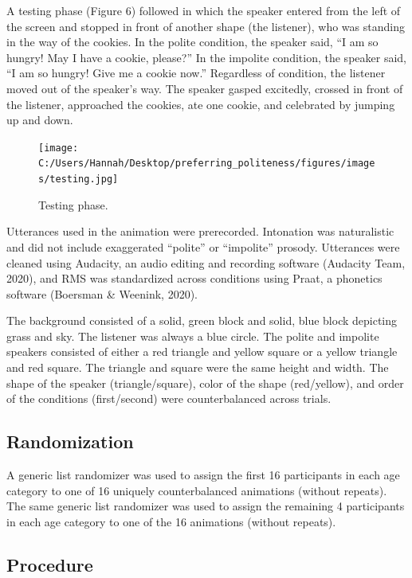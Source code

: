 \documentclass[
  english,
  man,floatsintext]{apa6}
\begin{document}
A testing phase (Figure 6) followed in which the speaker entered from the left of the screen and stopped in front of another shape (the listener), who was standing in the way of the cookies. In the polite condition, the speaker said, ``I am so hungry! May I have a cookie, please?'' In the impolite condition, the speaker said, ``I am so hungry! Give me a cookie now.'' Regardless of condition, the listener moved out of the speaker's way. The speaker gasped excitedly, crossed in front of the listener, approached the cookies, ate one cookie, and celebrated by jumping up and down.

\begin{figure}
\centering
\texttt{[image: C:/Users/Hannah/Desktop/preferring\_politeness/figures/images/testing.jpg]}
\caption{Testing phase.}
\end{figure}

Utterances used in the animation were prerecorded. Intonation was naturalistic and did not include exaggerated ``polite'' or ``impolite'' prosody. Utterances were cleaned using Audacity, an audio editing and recording software (Audacity Team, 2020), and RMS was standardized across conditions using Praat, a phonetics software (Boersman \& Weenink, 2020).

The background consisted of a solid, green block and solid, blue block depicting grass and sky. The listener was always a blue circle. The polite and impolite speakers consisted of either a red triangle and yellow square or a yellow triangle and red square. The triangle and square were the same height and width. The shape of the speaker (triangle/square), color of the shape (red/yellow), and order of the conditions (first/second) were counterbalanced across trials.

\hypertarget{randomization}{%
\subsection{Randomization}\label{randomization}}

A generic list randomizer was used to assign the first 16 participants in each age category to one of 16 uniquely counterbalanced animations (without repeats). The same generic list randomizer was used to assign the remaining 4 participants in each age category to one of the 16 animations (without repeats).

\hypertarget{procedure}{%
\subsection{Procedure}\label{procedure}}
\end{document}
